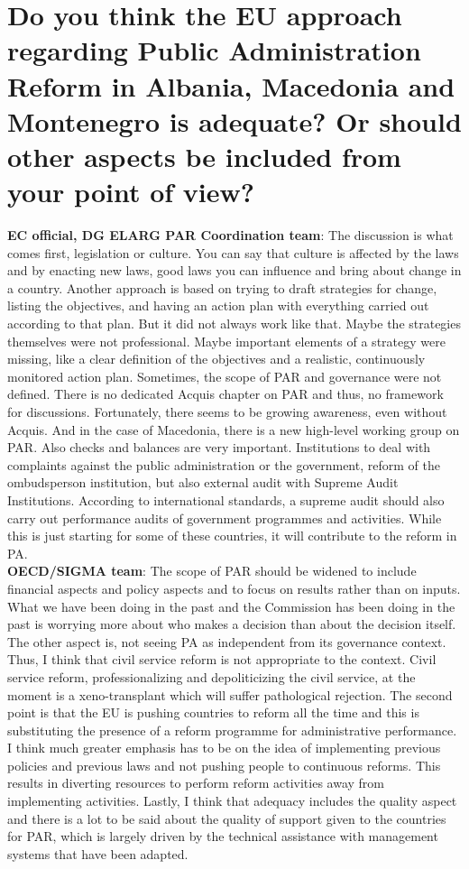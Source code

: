 \section{ Do you think the EU approach regarding Public Administration Reform in Albania, Macedonia and Montenegro is adequate? Or should other aspects be included from your point of view? }
\textbf{EC official, DG ELARG PAR Coordination team}: The discussion is what comes first, legislation or culture. You can say that culture is affected by the laws and by enacting new laws, good laws you can influence and bring about change in a country. Another approach is based on trying to draft strategies for change, listing the objectives, and having an action plan with everything carried out according to that plan. But it did not always work like that. Maybe the strategies themselves were not professional. Maybe important elements of a strategy were missing, like a clear definition of the objectives and a realistic, continuously monitored action plan. Sometimes, the scope of PAR and governance were not defined. There is no dedicated Acquis chapter on PAR and thus, no framework for discussions. Fortunately, there seems to be growing awareness, even without Acquis. And in the case of Macedonia, there is a new  high-level working group on PAR. Also checks and balances are very important. Institutions to deal with complaints against the public administration or the government, reform of the ombudsperson institution, but also external audit with Supreme Audit Institutions. According to international standards, a supreme audit should also carry out performance audits of government programmes and activities. While this is just starting for some of these countries, it will contribute to the reform in PA. \\
\textbf{OECD/SIGMA team}: The scope of PAR should be widened to include financial aspects and policy aspects and to focus on results rather than on inputs. What we have been doing in the past and the Commission has been doing in the past is worrying more about who makes a decision than about the decision itself. The other aspect is, not seeing PA as independent from its governance context. Thus, I think that civil service reform is not appropriate to the context. Civil service reform, professionalizing and depoliticizing the civil service, at the moment is a xeno-transplant which will suffer pathological rejection. The second point is that the EU is pushing countries to reform all the time and this is substituting the presence of a reform programme for administrative performance. I think much greater emphasis has to be on the idea of implementing previous policies and previous laws and not pushing people to continuous reforms. This results in diverting resources to perform reform activities away from implementing activities. Lastly, I think that adequacy includes the quality aspect and there is a lot to be said about the quality of support given to the countries for PAR, which is largely driven by the technical assistance with management systems that have been adapted.\\
